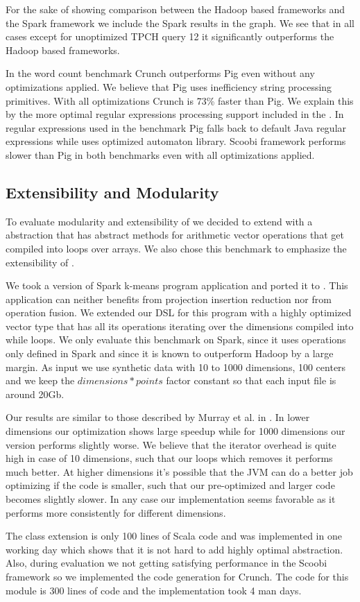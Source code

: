 For the sake of showing comparison between the Hadoop based frameworks and the Spark framework we include the Spark results in the graph. We see that in all cases except for unoptimized TPCH query 12 it significantly outperforms the Hadoop based frameworks.

In the word count benchmark Crunch outperforms Pig even without any optimizations applied. We believe that Pig uses inefficiency string processing primitives. With all optimizations Crunch is 73\% faster than Pig. We explain this by the more optimal regular expressions processing support included in the \tool. In regular expressions used in the benchmark Pig falls back to default Java regular expressions while \tool uses optimized automaton library. Scoobi framework performs slower than Pig in both benchmarks even with all optimizations applied.


\subsection{Extensibility and Modularity}
\label{subsec:kmeans}

To evaluate modularity and extensibility of \tool we decided to extend with a  abstraction that has abstract methods for arithmetic vector operations that get compiled into loops over arrays. We also chose this benchmark to emphasize the extensibility of \tool.

We took a version of Spark k-means program \cite{spark-nsdi} application and
ported it to \tool. This application can neither benefits from projection
insertion reduction nor from operation fusion. We extended our DSL for this
program with a highly optimized vector type that has all its operations
iterating over the dimensions compiled into while loops. We only evaluate this
benchmark on Spark, since it uses operations only defined in Spark and since it
is known to outperform Hadoop by a large margin. As input we use synthetic data
with 10 to 1000 dimensions, 100 centers and we keep the $dimensions * points$
factor constant so that each input file is around 20Gb.

Our results are similar to those described by Murray et al. in \cite{murray_steno:_2011}. In lower dimensions our optimization shows large speedup while for 1000 dimensions our version performs slightly worse. We believe that the iterator overhead is quite high in case of 10 dimensions, such that our loops which removes it performs much better. At higher dimensions it's possible that the JVM can do a better job optimizing if the code is smaller, such that our pre-optimized and larger code becomes slightly slower. In any case our implementation seems favorable as it performs more consistently for different dimensions.

The  class extension is only 100 lines of Scala code and was implemented in one working day which shows that it is not hard to add highly optimal abstraction. Also, during evaluation we not getting satisfying performance in the Scoobi framework so we implemented the code generation for Crunch. The code for this module is 300 lines of code and the implementation took 4 man days.
